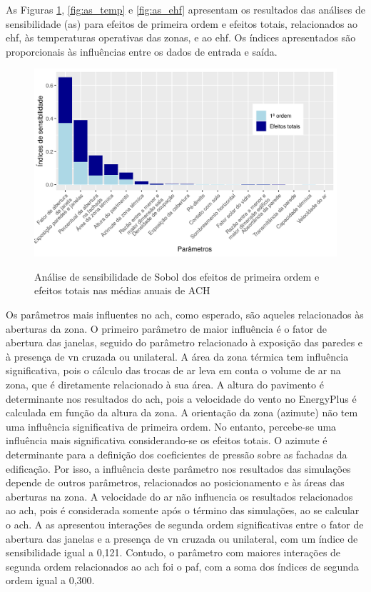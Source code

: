 \documentclass[brazil,hardcopy,openany]{ufscthesis} %
\newcommand{\sasize}{1}
\begin{document}
\newpage
As Figuras \ref{fig:as_ach}, \ref{fig:as_temp} e \ref{fig:as_ehf} apresentam os resultados das análises de sensibilidade (\acrshort{as}) para efeitos de primeira ordem e efeitos totais, relacionados ao \acrshort{ehf}, às temperaturas operativas das zonas, e ao \acrshort{ehf}. Os índices apresentados são proporcionais às influências entre os dados de entrada e saída.

\begin{figure}[H]
	\centering
	\caption{Análise de sensibilidade de Sobol dos efeitos de primeira ordem e efeitos totais nas médias anuais de ACH}
	\includegraphics[width=\sasize\linewidth]{img/as_ach.png}
	\label{fig:as_ach}
\end{figure}

Os parâmetros mais influentes no \acrshort{ach}, como esperado, são aqueles relacionados às aberturas da zona. 
O primeiro parâmetro de maior influência é o fator de abertura das janelas, seguido do parâmetro relacionado à exposição das paredes e à presença de \acrshort{vn} cruzada ou unilateral. 
A área da zona  térmica tem influência significativa, pois o cálculo das trocas de ar leva em conta o volume de ar na zona, que é diretamente relacionado à sua área. 
A altura do pavimento é determinante nos resultados do \acrshort{ach}, pois a velocidade do vento no EnergyPlus é calculada em função da altura da zona.
A orientação da zona (azimute) não tem uma influência significativa de primeira ordem. No entanto, percebe-se uma influência mais significativa considerando-se os efeitos totais. 
O azimute é determinante para a definição dos coeficientes de pressão sobre as fachadas da edificação. Por isso, a influência deste parâmetro nos resultados das simulações depende de outros parâmetros, relacionados ao posicionamento e às áreas das aberturas na zona.
A velocidade do ar não influencia os resultados relacionados ao \acrshort{ach}, pois é considerada somente após o término das simulações, ao se calcular o \acrshort{ach}.
A \acrshort{as} apresentou interações de segunda ordem significativas entre o fator de abertura das janelas e a presença de \acrshort{vn} cruzada ou unilateral, com um índice de sensibilidade igual a 0,121.
Contudo, o parâmetro com maiores interações de segunda ordem relacionados ao \acrshort{ach} foi o \acrshort{paf}, com a soma dos índices de segunda ordem igual a 0,300.
\end{document}
